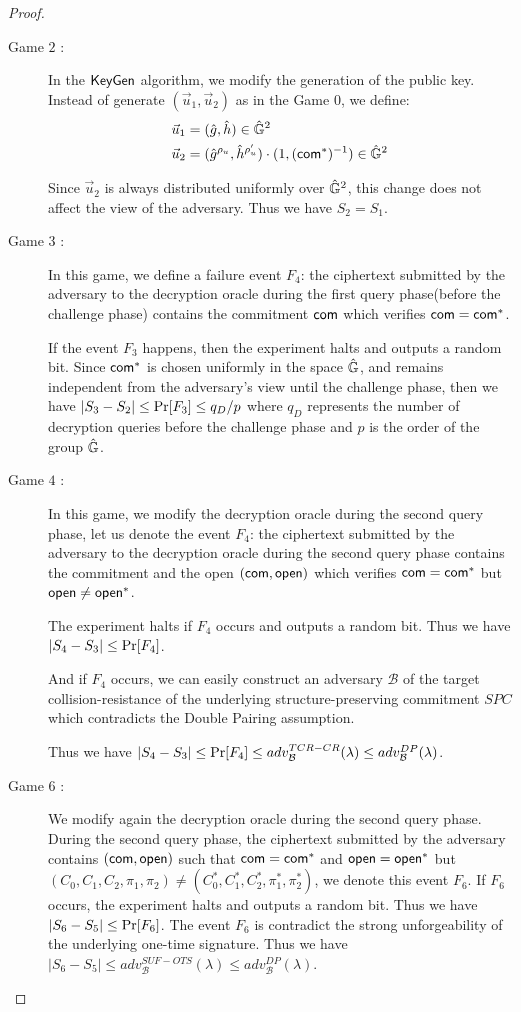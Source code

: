 \begin{proof}
\begin{description}
  \item[\textsf{Game} $2$ :] In the ${\mathsf{KeyGen}}$ algorithm, we modify the generation of the public key. Instead of generate $(\vec{u}_1, \vec{u}_2)$ as in the \textsf{Game} 0, we define:
    \begin{align*}
      \vec{u}_1 &= (\hat{g}, \hat{h}) \in \hat{\mathbb{G}}^2\\
      \vec{u}_2 &= (\hat{g}^{\rho_u}, \hat{h}^{\rho_u'}) \cdot (1, (\mathsf{com}^*)^{-1}) \in \hat{\mathbb{G}}^2
    \end{align*}

    Since $\vec{u}_2$ is always distributed uniformly over $\hat{\mathbb{G}}^2$, this change does not affect the view of the adversary. Thus we have $S_2 = S_1$.


  \item[\textsf{Game} $3$ :] In this game, we define a failure event $F_4$: the ciphertext submitted by the adversary to the decryption oracle during the first query phase(before the challenge phase) contains the commitment $\mathsf{com}$ which verifies $\mathsf{com} = \mathsf{com}^*$.

    If the event $F_3$ happens, then the experiment halts and outputs a random bit. Since $\mathsf{com}^*$ is chosen uniformly in the space $\hat{\mathbb{G}}$, and remains independent from the adversary's view until the challenge phase, then we have $|S_3 - S_2| \leq \operatorname{Pr}[F_3] \leq q_D/p$ where $q_D$ represents the number of decryption queries before the challenge phase and $p$ is the order of the group $\hat{\mathbb{G}}$.

  \item[\textsf{Game} $4$ :] In this game, we modify the decryption oracle during the second query phase, let us denote the event $F_4$: the ciphertext submitted by the adversary to the decryption oracle during the second query phase contains the commitment and the open $(\mathsf{com}, \mathsf{open})$ which verifies $\mathsf{com} = \mathsf{com}^*$ but $\mathsf{open} \neq \mathsf{open}^*$.

    The experiment halts if $F_4$ occurs and outputs a random bit. Thus we have $|S_4- S_3| \leq \operatorname{Pr}[F_4]$.

    And if $F_4$ occurs, we can easily construct an adversary $\mathcal{B}$ of the target collision-resistance of the underlying structure-preserving commitment $SPC$ which contradicts the Double Pairing assumption.

    Thus we have $|S_4 - S_3| \leq \operatorname{Pr}[F_4] \leq adv_{\mathcal{B}}^{TCR-CR}(\lambda) \leq adv_{\mathcal{B}}^{DP}(\lambda)$.

  \item[\textsf{Game} $6$ :] We modify again the decryption oracle during the second query phase.
    During the second query phase, the ciphertext submitted by the adversary contains $(\mathsf{com}, \mathsf{open})$ such that $\mathsf{com} = \mathsf{com}^*$ and $\mathsf{open} = \mathsf{open}^*$ but $(C_0, C_1, C_2, \pi_1, \pi_2) \neq (C_0^*, C_1^*, C_2^*, \pi_1^*, \pi_2^*)$, we denote this event $F_6$. If $F_6$ occurs, the experiment halts and outputs a random bit. Thus we have $|S_6 - S_5| \leq \operatorname{Pr}[F_6]$. The event $F_6$ is contradict the strong unforgeability of the underlying one-time signature. Thus we have $|S_6 - S_5| \leq adv_{\mathcal{B}}^{SUF-OTS}(\lambda) \leq adv_{\mathcal{B}}^{DP}(\lambda)$.
    


\end{description}
\end{proof}
